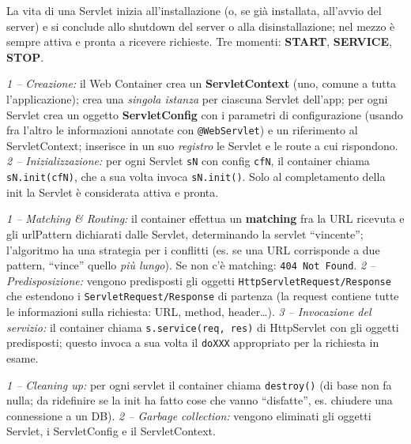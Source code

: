 La vita di una Servlet inizia all'installazione (o, se gi\`a installata, all'avvio del
server) e si conclude allo shutdown del server o alla disinstallazione; nel mezzo \`e sempre
attiva e pronta a ricevere richieste. Tre momenti: \textbf{START}, \textbf{SERVICE},
\textbf{STOP}.

\begin{importante}[START]
\emph{1 -- Creazione:} il Web Container crea un \textbf{ServletContext} (uno, comune a tutta
l'applicazione); crea una \emph{singola istanza} per ciascuna Servlet dell'app; per ogni
Servlet crea un oggetto \textbf{ServletConfig} con i parametri di configurazione (usando fra
l'altro le informazioni annotate con \texttt{@WebServlet}) e un riferimento al
ServletContext; inserisce in un suo \emph{registro} le Servlet e le route a cui rispondono.
\emph{2 -- Inizializzazione:} per ogni Servlet \texttt{sN} con config \texttt{cfN}, il
container chiama \texttt{sN.init(cfN)}, che a sua volta invoca \texttt{sN.init()}. Solo al
completamento della init la Servlet \`e considerata attiva e pronta.
\end{importante}

\begin{importante}[SERVICE]
\emph{1 -- Matching \& Routing:} il container effettua un \textbf{matching} fra la URL
ricevuta e gli urlPattern dichiarati dalle Servlet, determinando la servlet ``vincente'';
l'algoritmo ha una strategia per i conflitti (es. se una URL corrisponde a due pattern,
``vince'' quello \emph{pi\`u lungo}). Se non c'\`e matching: \texttt{404 Not Found}.
\emph{2 -- Predisposizione:} vengono predisposti gli oggetti
\texttt{HttpServletRequest/Response} che estendono i \texttt{ServletRequest/Response} di
partenza (la request contiene tutte le informazioni sulla richiesta: URL, method,
header\dots).
\emph{3 -- Invocazione del servizio:} il container chiama \texttt{s.service(req, res)} di
HttpServlet con gli oggetti predisposti; questo invoca a sua volta il \texttt{doXXX}
appropriato per la richiesta in esame.
\end{importante}

\begin{importante}[STOP]
\emph{1 -- Cleaning up:} per ogni servlet il container chiama \texttt{destroy()} (di base non
fa nulla; da ridefinire se la init ha fatto cose che vanno ``disfatte'', es. chiudere una
connessione a un DB).
\emph{2 -- Garbage collection:} vengono eliminati gli oggetti Servlet, i ServletConfig e il
ServletContext.
\end{importante}
